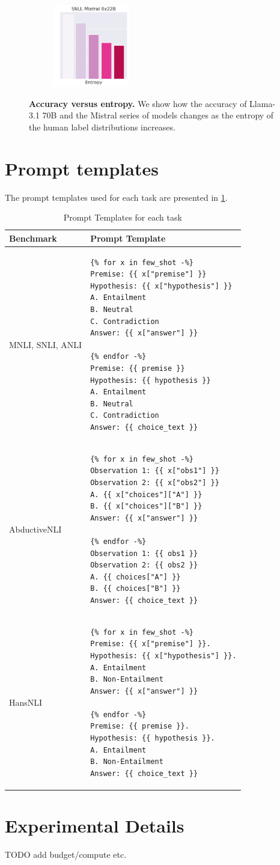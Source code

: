 \begin{figure}[t]
    \begin{subfigure}[b]{0.23\textwidth}
        \includegraphics[height=3.6cm]{figures/appendix/entropy_acc_snli_8x22B}
    \end{subfigure}
    \caption{\textbf{Accuracy versus entropy.} We show how the accuracy of Llama-3.1 70B and the Mistral series of models changes as the entropy of the human label distributions increases.}
    \label{fig:entropy_accuracy_all}
\end{figure}

\section{Prompt templates}

The prompt templates used for each task are presented in \cref{tab:prompt_template}.

\begin{table}[t]
    \centering
    \small
    \begin{tabular}{lp{8cm}}
        \toprule
        \textbf{Benchmark} & \textbf{Prompt Template} \\
        \midrule
        MNLI, SNLI, ANLI & \begin{verbatim}
{% for x in few_shot -%}
Premise: {{ x["premise"] }}
Hypothesis: {{ x["hypothesis"] }}
A. Entailment
B. Neutral
C. Contradiction
Answer: {{ x["answer"] }}

{% endfor -%}
Premise: {{ premise }}
Hypothesis: {{ hypothesis }}
A. Entailment
B. Neutral
C. Contradiction
Answer: {{ choice_text }}
\end{verbatim} \\
\midrule
AbductiveNLI & \begin{verbatim}
{% for x in few_shot -%}
Observation 1: {{ x["obs1"] }}
Observation 2: {{ x["obs2"] }}
A. {{ x["choices"]["A"] }}
B. {{ x["choices"]["B"] }}
Answer: {{ x["answer"] }}

{% endfor -%}
Observation 1: {{ obs1 }}
Observation 2: {{ obs2 }}
A. {{ choices["A"] }}
B. {{ choices["B"] }}
Answer: {{ choice_text }}
\end{verbatim} \\
\midrule
HansNLI & \begin{verbatim}
{% for x in few_shot -%}
Premise: {{ x["premise"] }}.
Hypothesis: {{ x["hypothesis"] }}.
A. Entailment
B. Non-Entailment
Answer: {{ x["answer"] }}

{% endfor -%}
Premise: {{ premise }}.
Hypothesis: {{ hypothesis }}.
A. Entailment
B. Non-Entailment
Answer: {{ choice_text }}
\end{verbatim} \\
\bottomrule
\end{tabular}
\caption{Prompt Templates for each task}
\label{tab:prompt_template}
\end{table}

\section{Experimental Details}
\label{appx:experiments}

TODO add budget/compute etc.